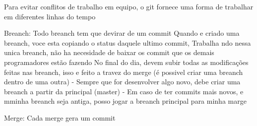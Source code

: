 Para evitar conflitos de trabalho em equipo, o git fornece uma forma de trabalhar em diferentes linhas do tempo

Breanch: Todo breanch tem que devirar de um commit 
Quando e criado uma breanch, voce esta copiando o status daquele ultimo commit,
Trabalha ndo nessa unica breanch, não ha necesidade de baixar os commit que os demais programadores estão fazendo
No final do dia, devem subir todas as modificações feitas nas breanch, isso e feito a travez do merge
(é possivel criar uma breanch dentro de uma outra)
 - Sempre que for desenvolver algo novo, debe criar uma breanch a partir da principal (master)
 - Em caso de ter commits mais novos, e mminha breanch seja antiga, posso jogar a breanch principal
    para minha marge

Merge: Cada merge gera um commit 

 
